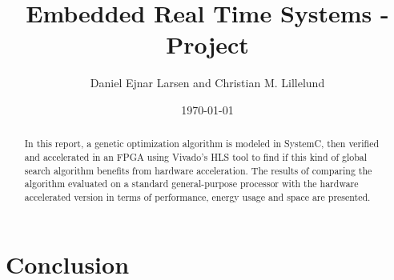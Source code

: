 \documentclass{article}
\title{Embedded Real Time Systems - Project}
\author{Daniel Ejnar Larsen and Christian M. Lillelund}
\date{\today}
\begin{document}
\maketitle
\begin{abstract}
	In this report, a genetic optimization algorithm is modeled in SystemC, then verified and accelerated in an FPGA using Vivado's HLS tool to find if this kind of global search algorithm benefits from hardware acceleration. The results of comparing the algorithm evaluated on a standard general-purpose processor with the hardware accelerated version in terms of performance, energy usage and space are presented.
\end{abstract}
















\section{Conclusion}


\end{document}
